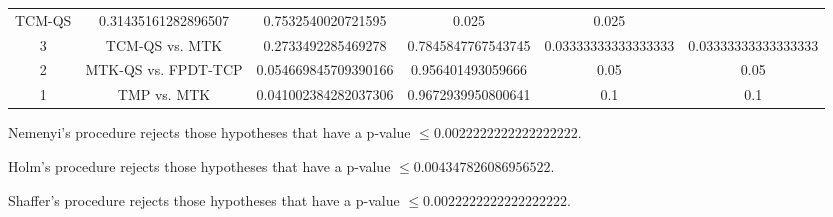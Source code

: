 \documentclass[a4paper,10pt]{article}
\begin{document}
\begin{landscape}
\begin{table}[!htp]
\begin{tabular}{cccccc}
TCM-QS&0.31435161282896507&0.7532540020721595&0.025&0.025\\3&TCM-QS vs. MTK&0.2733492285469278&0.7845847767543745&0.03333333333333333&0.03333333333333333\\2&MTK-QS vs. FPDT-TCP&0.054669845709390166&0.956401493059666&0.05&0.05\\1&TMP vs. MTK&0.041002384282037306&0.9672939950800641&0.1&0.1\\\hline
\end{tabular}
\end{table}
Nemenyi's procedure rejects those hypotheses that have a p-value $\le0.0022222222222222222$.


Holm's procedure rejects those hypotheses that have a p-value $\le0.004347826086956522$.


Shaffer's procedure rejects those hypotheses that have a p-value $\le0.0022222222222222222$.



\end{landscape}
\end{document}
